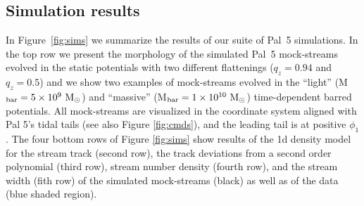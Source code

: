 \documentclass[twocolumn]{aastex62}
\newcommand{\msun}{\textrm{M}_\odot}
\begin{document}
\subsection{Simulation results}
\label{sec:sim_results}
In Figure~\ref{fig:sims} we summarize the results of our suite of Pal~5 simulations. In the top row we present the morphology of the simulated Pal~5 mock-streams evolved in the static potentials with two different flattenings ($q_z = 0.94$ and $q_z = 0.5$) and we show two examples of mock-streams evolved in the ``light'' (M$_{\rm bar} = 5\times 10^9~\msun$) and ``massive'' (M$_{\rm bar} = 1\times 10^{10}~\msun$) time-dependent barred potentials. All mock-streams are visualized in the coordinate system aligned with Pal 5's tidal tails (see also Figure \ref{fig:cmds}), and the leading tail is at positive $\phi_1$. The four bottom rows of Figure \ref{fig:sims} show results of the 1d density model for the stream track (second row), the track deviations from a second order polynomial (third row), stream number density (fourth row), and the stream width (fith row) of the simulated mock-streams (black) as well as of the data (blue shaded region).
\end{document}

